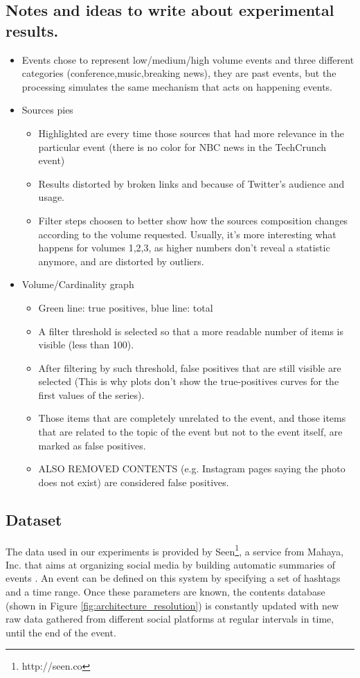 \documentclass{sig-alternate}
\begin{document}
\subsection{Notes and ideas to write about experimental results.}
\begin{itemize}
\item Events chose to represent low/medium/high volume events and three different categories (conference,music,breaking news), they are past events, but the processing simulates the same mechanism that acts on happening events.
\item Sources pies
  \begin{itemize}
    \item Highlighted are every time those sources that had more relevance in the particular event (there is no color for NBC news in the TechCrunch event)
    \item Results distorted by broken links and because of Twitter's audience and usage.
    \item Filter steps choosen to better show how the sources composition changes according to the volume requested. Usually, it's more interesting what happens for volumes 1,2,3, as higher numbers don't reveal a statistic anymore, and are distorted by outliers.
  \end{itemize}
\item Volume/Cardinality graph
\begin{itemize}
    \item Green line: true positives, blue line: total
    \item A filter threshold is selected so that a more readable number of items is visible (less than 100).
    \item After filtering by such threshold, false positives that are still visible are selected (This is why plots don't show the true-positives curves for the first values of the series).
    \item Those items that are completely unrelated to the event, and those items that are related to the topic of the event but not to the event itself, are marked as false positives.
    \item ALSO REMOVED CONTENTS (e.g. Instagram pages saying the photo does not exist) are considered false positives.
\end{itemize}
\end{itemize}

\subsection{Dataset}
\label{sec:dataset}
The data used in our experiments is provided by Seen\footnote{http://seen.co}, a service from Mahaya, Inc. that aims at organizing social media by building automatic summaries of events \cite{SeenWired}. An event can be defined on this system by specifying a set of hashtags and a time range. Once these parameters are known, the contents database (shown in Figure \ref{fig:architecture_resolution}) is constantly updated with new raw data gathered from different social platforms at regular intervals in time, until the end of the event.
\end{document}
